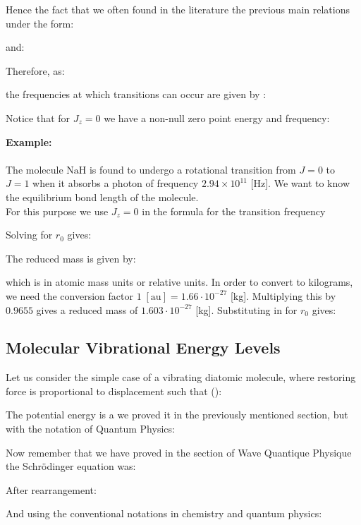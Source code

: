 	Hence the fact that we often found in the literature the previous main relations under the form:
	
	and:
	
	Therefore, as: 
	
	the frequencies at which transitions can occur are given by :
	
	Notice that for $J_z=0$ we have a non-null zero point energy and frequency:
	
	
	\begin{tcolorbox}[colframe=black,colback=white,sharp corners]
	\textbf{{\Large {}}Example:}\\\\
	The molecule $\mathrm{NaH}$ is found to undergo a rotational transition from  $J=0$ to $J=1$ when it absorbs a photon of frequency $2.94 \times 10^{11}$ [Hz]. We want to know the equilibrium bond length of the molecule.\\

	For this purpose we use $J_z=0$ in the formula for the transition frequency 
	
	Solving for $r_0$ gives:
	
	The reduced mass is given by:
	
	which is in atomic mass units or relative units. In order to convert to kilograms, we need the conversion factor $1\;[\text{au}]= 1.66\cdot 10^{-27}$ [kg]. Multiplying this by $0.9655$ gives a reduced mass of $1.603\cdot 10^{-27}$ [kg]. Substituting in for $r_0$ gives:
	
	\end{tcolorbox}

	\pagebreak
	\subsection{Molecular Vibrational Energy Levels}
	Let us consider the simple case of a vibrating diatomic molecule, where restoring force is proportional to displacement such that ():
	
	The potential energy is a we proved it in the previously mentioned section, but with the notation of Quantum Physics:
	
	Now remember that we have proved in the section of Wave Quantique Physique the Schrödinger equation was:
	
	After rearrangement:
	
	And using the conventional notations in chemistry and quantum physics:
	
